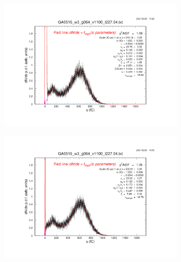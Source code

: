 \begin{figure}[b]
	\centering
	\begin{subfigure}[c]{0.42\linewidth}
		\centering
		\includegraphics[width=\linewidth, trim={6cm 6cm 75mm 85mm},clip]{figures/GA0516_w2_g064_v1100_3mm.04.png}
		\vspace{0mm}
	\end{subfigure}%
	\begin{subfigure}[c]{0.42\linewidth}
		\centering
		\includegraphics[width=\linewidth, trim={75mm 6cm 6cm 85mm},clip]{figures/GA0516_w3_g064_v1100_cln.04.png}
		\vspace{0mm}
	\end{subfigure}%
	\vspace{0mm}
	\begin{subfigure}[c]{0.42\linewidth}
		\centering

\end{subfigure}
\end{figure}

